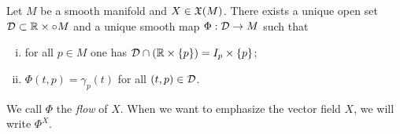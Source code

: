 \begin{theorem} %
  \label{thm:exuniqmax}
  Let $M$ be a smooth manifold and $X\in\mathfrak{X}(M)$.
  There exists a unique open set $\mathcal{D} \subset \mathbb{R}\times\circ M$ and a unique smooth map $\Phi:\mathcal{D}\to M$ such that
  \begin{enumerate}[(i)]
    \item\label{thm:exuniqmax:i} for all $p\in M$ one has $\mathcal{D}\cap(\mathbb{R}\times\{p\}) = I_p\times\{p\}$;
    \item\label{thm:exuniqmax:ii} $\Phi(t,p) = \gamma_p(t)$ for all $(t,p)\in\mathcal{D}$.
  \end{enumerate}
\end{theorem}

We call $\Phi$ the \emph{flow} of $X$.
When we want to emphasize the vector field $X$, we will write $\Phi^X$.

